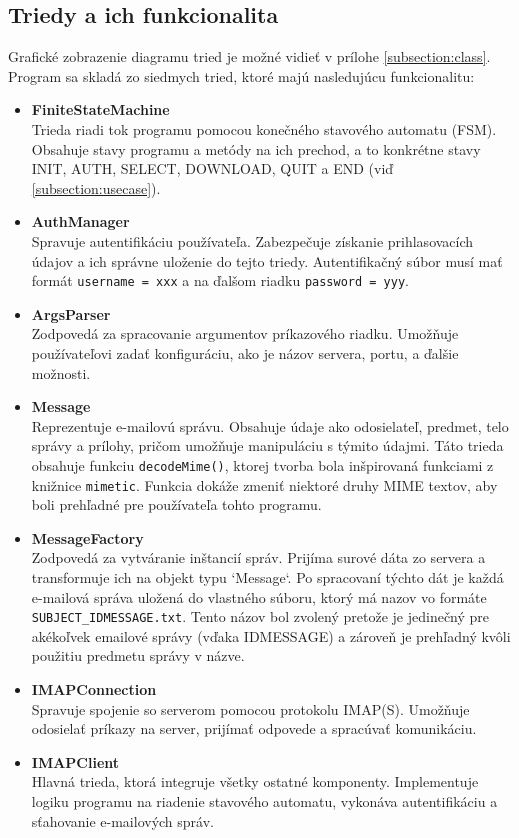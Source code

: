 \documentclass[a4paper, 11pt]{article}
\begin{document}
	\subsection{Triedy a ich funkcionalita}
	Grafické zobrazenie diagramu tried je možné vidieť v prílohe \ref{subsection:class}. Program sa skladá zo siedmych tried, ktoré majú nasledujúcu funkcionalitu:
	\begin{itemize}
		\item \textbf{FiniteStateMachine} \\
		Trieda riadi tok programu pomocou konečného stavového automatu (FSM). Obsahuje stavy programu a metódy na ich prechod, a to konkrétne stavy INIT, AUTH, SELECT, DOWNLOAD, QUIT a END (viď \ref{subsection:usecase}).
	
		\item \textbf{AuthManager} \\
		Spravuje autentifikáciu používateľa. Zabezpečuje získanie prihlasovacích údajov a ich správne uloženie do tejto triedy. Autentifikačný súbor musí mať formát \texttt{username =  xxx} a na ďalšom riadku \texttt{password =  yyy}.
	
		\item \textbf{ArgsParser} \\
		Zodpovedá za spracovanie argumentov príkazového riadku. Umožňuje používateľovi zadať konfiguráciu, ako je názov servera, portu, a ďalšie možnosti.
	
		\item \textbf{Message} \\
		Reprezentuje e-mailovú správu. Obsahuje údaje ako odosielateľ, predmet, telo správy a prílohy, pričom umožňuje manipuláciu s týmito údajmi. Táto trieda obsahuje funkciu \texttt{decodeMime()}, ktorej tvorba bola inšpirovaná funkciami z knižnice \texttt{mimetic}. Funkcia dokáže zmeniť niektoré druhy MIME textov, aby boli prehľadné pre používateľa tohto programu.
	
		\item \textbf{MessageFactory} \\
		Zodpovedá za vytváranie inštancií správ. Prijíma surové dáta zo servera a transformuje ich na objekt typu `Message`. Po spracovaní týchto dát je každá e-mailová správa uložená do vlastného súboru, ktorý má nazov vo formáte \texttt{SUBJECT\_IDMESSAGE.txt}. Tento názov bol zvolený pretože je jedinečný pre akékoľvek emailové správy (vďaka IDMESSAGE) a zároveň je prehľadný kvôli použitiu predmetu správy v názve.
	
		\item \textbf{IMAPConnection} \\
		Spravuje spojenie so serverom pomocou protokolu IMAP(S). Umožňuje odosielať príkazy na server, prijímať odpovede a spracúvať komunikáciu\cite{opennsslapi}.
	
		\item \textbf{IMAPClient} \\
		Hlavná trieda, ktorá integruje všetky ostatné komponenty. Implementuje logiku programu na riadenie stavového automatu, vykonáva autentifikáciu a sťahovanie e-mailových správ.
	\end{itemize}	
\end{document}
